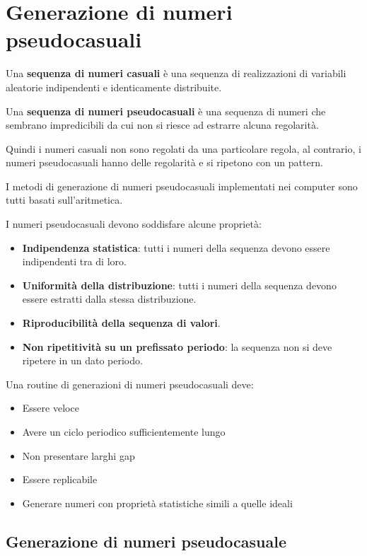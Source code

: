 \section{Generazione di numeri pseudocasuali}
\begin{definizione} 
    Una \textbf{sequenza di numeri casuali} è una sequenza di realizzazioni di
    variabili aleatorie indipendenti e identicamente distribuite.
\end{definizione}
\begin{definizione} 
    Una \textbf{sequenza di numeri pseudocasuali} è una sequenza di numeri che
    sembrano impredicibili da cui non si riesce ad estrarre alcuna regolarità.
\end{definizione}
Quindi i numeri casuali non sono regolati da una particolare regola, al contrario,
i numeri pseudocasuali hanno delle regolarità e si ripetono con un pattern.
\begin{nota}
    I metodi di generazione di numeri pseudocasuali implementati nei computer
    sono tutti basati sull'aritmetica.
\end{nota}
I numeri pseudocasuali devono soddisfare alcune proprietà:
\begin{itemize}
    \item \textbf{Indipendenza statistica}: tutti i numeri della sequenza devono
          essere indipendenti tra di loro.
    \item \textbf{Uniformità della distribuzione}: tutti i numeri della sequenza
          devono essere estratti dalla stessa distribuzione.
    \item \textbf{Riproducibilità della sequenza di valori}.
    \item \textbf{Non ripetitività su un prefissato periodo}: la sequenza non si
          deve ripetere in un dato periodo.
\end{itemize}
Una routine di generazioni di numeri pseudocasuali deve:
\begin{itemize}
    \item Essere veloce
    \item Avere un ciclo periodico sufficientemente lungo
    \item Non presentare larghi gap
    \item Essere replicabile
    \item Generare numeri con proprietà statistiche simili a quelle ideali
\end{itemize}
\subsection{Generazione di numeri pseudocasuale}
